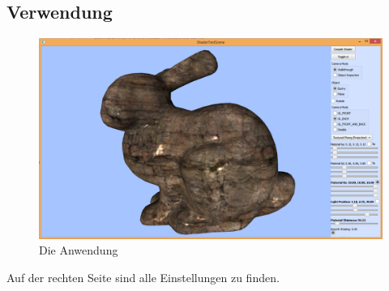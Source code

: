 \documentclass[a4paper,12pt]{article}
\begin{document}
\subsection{Verwendung}
\begin{figure}
	\centering
		\includegraphics[width=\textwidth,height=\textheight,keepaspectratio]{Bilder/SpecularMap.png}
	\caption{Die Anwendung}
	\label{fig:Interface}
\end{figure}
Auf der rechten Seite sind alle Einstellungen zu finden.
\end{document}
